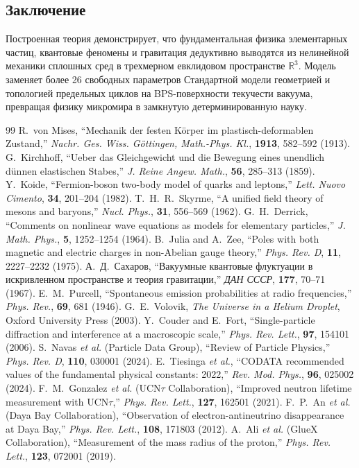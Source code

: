 \documentclass[12pt,a4paper]{article}
\begin{document}
	\subsection{Заключение}
	Построенная теория демонстрирует, что фундаментальная физика элементарных частиц, квантовые феномены и гравитация дедуктивно выводятся из нелинейной механики сплошных сред в трехмерном евклидовом пространстве $\mathbb{R}^3$. Модель заменяет более 26 свободных параметров Стандартной модели геометрией и топологией предельных циклов на BPS-поверхности текучести вакуума, превращая физику микромира в замкнутую детерминированную науку.
	
	\FloatBarrier 
	\begin{thebibliography}{99}
	 R.~von Mises, ``Mechanik der festen K{\"o}rper im plastisch-deformablen Zustand,'' \textit{Nachr. Ges. Wiss. G{\"o}ttingen, Math.-Phys. Kl.}, \textbf{1913}, 582--592 (1913).
	 G.~Kirchhoff, ``Ueber das Gleichgewicht und die Bewegung eines unendlich d{\"u}nnen elastischen Stabes,'' \textit{J. Reine Angew. Math.}, \textbf{56}, 285--313 (1859).
	 Y.~Koide, ``Fermion-boson two-body model of quarks and leptons,'' \textit{Lett. Nuovo Cimento}, \textbf{34}, 201--204 (1982).
	 T.~H.~R.~Skyrme, ``A unified field theory of mesons and baryons,'' \textit{Nucl. Phys.}, \textbf{31}, 556--569 (1962).
	 G.~H.~Derrick, ``Comments on nonlinear wave equations as models for elementary particles,'' \textit{J. Math. Phys.}, \textbf{5}, 1252--1254 (1964).
	 B.~Julia and A.~Zee, ``Poles with both magnetic and electric charges in non-Abelian gauge theory,'' \textit{Phys. Rev. D}, \textbf{11}, 2227--2232 (1975).
	 А.~Д.~Сахаров, ``Вакуумные квантовые флуктуации в искривленном пространстве и теория гравитации,'' \textit{ДАН СССР}, \textbf{177}, 70--71 (1967).
	 E.~M.~Purcell, ``Spontaneous emission probabilities at radio frequencies,'' \textit{Phys. Rev.}, \textbf{69}, 681 (1946).
	 G.~E.~Volovik, \textit{The Universe in a Helium Droplet}, Oxford University Press (2003).
	 Y.~Couder and E.~Fort, ``Single-particle diffraction and interference at a macroscopic scale,'' \textit{Phys. Rev. Lett.}, \textbf{97}, 154101 (2006).
	 S.~Navas \textit{et al.} (Particle Data Group), ``Review of Particle Physics,'' \textit{Phys. Rev. D}, \textbf{110}, 030001 (2024).
	 E.~Tiesinga \textit{et al.}, ``CODATA recommended values of the fundamental physical constants: 2022,'' \textit{Rev. Mod. Phys.}, \textbf{96}, 025002 (2024).
	 F.~M.~Gonzalez \textit{et al.} (UCN$\tau$ Collaboration), ``Improved neutron lifetime measurement with UCN$\tau$,'' \textit{Phys. Rev. Lett.}, \textbf{127}, 162501 (2021).
	 F.~P.~An \textit{et al.} (Daya Bay Collaboration), ``Observation of electron-antineutrino disappearance at Daya Bay,'' \textit{Phys. Rev. Lett.}, \textbf{108}, 171803 (2012).
	 A.~Ali \textit{et al.} (GlueX Collaboration), ``Measurement of the mass radius of the proton,'' \textit{Phys. Rev. Lett.}, \textbf{123}, 072001 (2019).
	\end{thebibliography}
	
	
\end{document}
